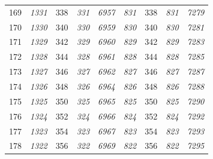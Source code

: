 \documentclass[10pt,fleqn]{article}
\begin{document}
\begin{longtable}{c|cccccccc}
169 & {\color{blue} \it 1331 \rm} & {\color{black} 338} & {\color{blue} \it 331 \rm} & {\color{blue} \it 6957 \rm} & {\color{blue} \it 831 \rm} & {\color{black} 338} & {\color{blue} \it 831 \rm} & {\color{blue} \it 7279 \rm} \\
170 & {\color{blue} \it 1330 \rm} & {\color{black} 340} & {\color{blue} \it 330 \rm} & {\color{blue} \it 6959 \rm} & {\color{blue} \it 830 \rm} & {\color{black} 340} & {\color{blue} \it 830 \rm} & {\color{blue} \it 7281 \rm} \\
171 & {\color{blue} \it 1329 \rm} & {\color{black} 342} & {\color{blue} \it 329 \rm} & {\color{blue} \it 6960 \rm} & {\color{blue} \it 829 \rm} & {\color{black} 342} & {\color{blue} \it 829 \rm} & {\color{blue} \it 7283 \rm} \\
172 & {\color{blue} \it 1328 \rm} & {\color{black} 344} & {\color{blue} \it 328 \rm} & {\color{blue} \it 6961 \rm} & {\color{blue} \it 828 \rm} & {\color{black} 344} & {\color{blue} \it 828 \rm} & {\color{blue} \it 7285 \rm} \\
173 & {\color{blue} \it 1327 \rm} & {\color{black} 346} & {\color{blue} \it 327 \rm} & {\color{blue} \it 6962 \rm} & {\color{blue} \it 827 \rm} & {\color{black} 346} & {\color{blue} \it 827 \rm} & {\color{blue} \it 7287 \rm} \\
174 & {\color{blue} \it 1326 \rm} & {\color{black} 348} & {\color{blue} \it 326 \rm} & {\color{blue} \it 6964 \rm} & {\color{blue} \it 826 \rm} & {\color{black} 348} & {\color{blue} \it 826 \rm} & {\color{blue} \it 7288 \rm} \\
175 & {\color{blue} \it 1325 \rm} & {\color{black} 350} & {\color{blue} \it 325 \rm} & {\color{blue} \it 6965 \rm} & {\color{blue} \it 825 \rm} & {\color{black} 350} & {\color{blue} \it 825 \rm} & {\color{blue} \it 7290 \rm} \\
176 & {\color{blue} \it 1324 \rm} & {\color{black} 352} & {\color{blue} \it 324 \rm} & {\color{blue} \it 6966 \rm} & {\color{blue} \it 824 \rm} & {\color{black} 352} & {\color{blue} \it 824 \rm} & {\color{blue} \it 7292 \rm} \\
177 & {\color{blue} \it 1323 \rm} & {\color{black} 354} & {\color{blue} \it 323 \rm} & {\color{blue} \it 6967 \rm} & {\color{blue} \it 823 \rm} & {\color{black} 354} & {\color{blue} \it 823 \rm} & {\color{blue} \it 7293 \rm} \\
178 & {\color{blue} \it 1322 \rm} & {\color{black} 356} & {\color{blue} \it 322 \rm} & {\color{blue} \it 6969 \rm} & {\color{blue} \it 822 \rm} & {\color{black} 356} & {\color{blue} \it 822 \rm} & {\color{blue} \it 7295 \rm} \\

\end{longtable}
\end{document}
